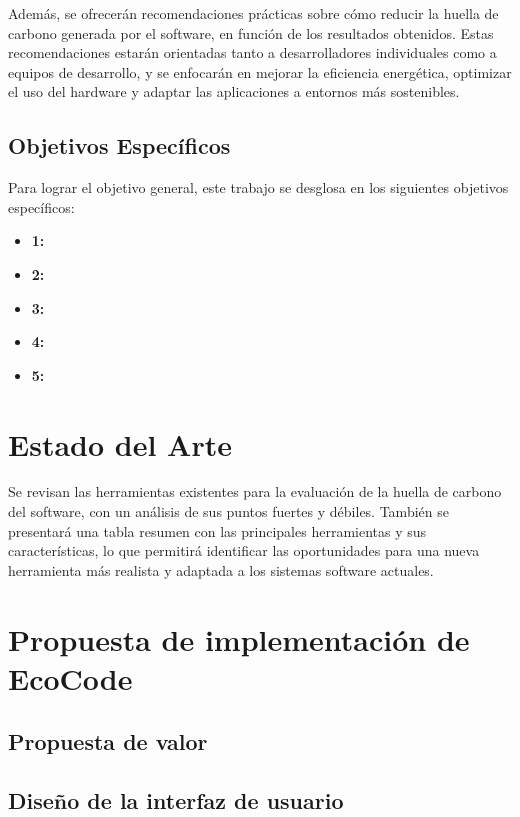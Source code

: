 \documentclass[12pt,a4paper]{report}
\begin{document}
Además, se ofrecerán recomendaciones prácticas sobre cómo reducir la huella de carbono generada por el software, en función de los resultados obtenidos. Estas recomendaciones estarán orientadas tanto a desarrolladores individuales como a equipos de desarrollo, y se enfocarán en mejorar la eficiencia energética, optimizar el uso del hardware y adaptar las aplicaciones a entornos más sostenibles.

\section{Objetivos Específicos}
Para lograr el objetivo general, este trabajo se desglosa en los siguientes objetivos específicos:

\begin{itemize}
    \item \textbf{1:} 
    \item \textbf{2:} 
    \item \textbf{3:} 
    \item \textbf{4:} 
    \item \textbf{5:} 
\end{itemize}

\chapter{Estado del Arte}

Se revisan las herramientas existentes para la evaluación de la huella de carbono del software, con un análisis de sus puntos fuertes y débiles. También se presentará una tabla resumen con las principales herramientas y sus características, lo que permitirá identificar las oportunidades para una nueva herramienta más realista y adaptada a los sistemas software actuales.

\chapter{Propuesta de implementación de EcoCode}

\section{Propuesta de valor}

\section{Diseño de la interfaz de usuario}
\end{document}
